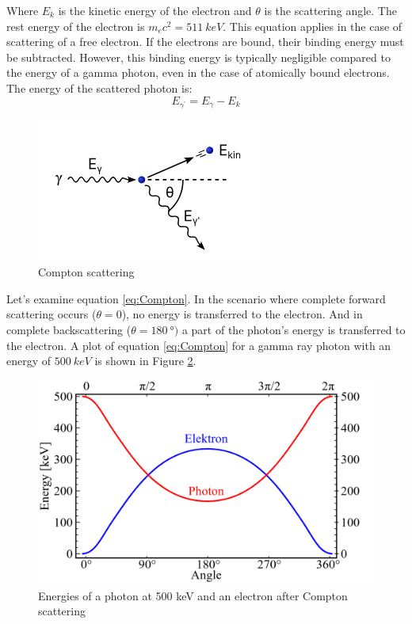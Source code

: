 \documentclass{article}
\begin{document}
Where $E_k$ is the kinetic energy of the electron and $\theta$ is the scattering angle. The rest energy of the electron is $m_{e} c^2 = \SI{511}{keV}$. This equation applies in the case of scattering of a free electron. If the electrons are bound, their binding energy must be subtracted. However, this binding energy is typically negligible compared to the energy of a gamma photon, even in the case of atomically bound electrons. The energy of the scattered photon is: 
\begin{equation}
    E_{\gamma^\prime} =  E_\gamma -  E_k
\end{equation}

\begin{figure}[h]
    \centering
    \includegraphics[width=0.5\linewidth]{Figures/Intro/3.png}
    \caption{Compton scattering \cite{plotzki_2024_highresolution}}
    \label{fig:Compton scattering}
\end{figure}

Let's examine equation \ref{eq:Compton}. In the scenario where complete forward scattering occurs ($\theta = 0$), no energy is transferred to the electron. And in complete backscattering ($\theta = \SI{180}{\degree})$ a part of the photon's energy is transferred to the electron. A plot of equation \ref{eq:Compton} for a gamma ray photon with an energy of $\SI{500}{keV}$ is shown in Figure \ref{fig:Compton scattering graph}.

\begin{figure}[h]
    \centering
    \includegraphics[width=0.5\linewidth]{Figures/Intro/4.png}
    \caption{Energies of a photon at 500 keV and an electron after Compton scattering \cite{_2020_compton}}
    \label{fig:Compton scattering graph}
\end{figure}
\end{document}
